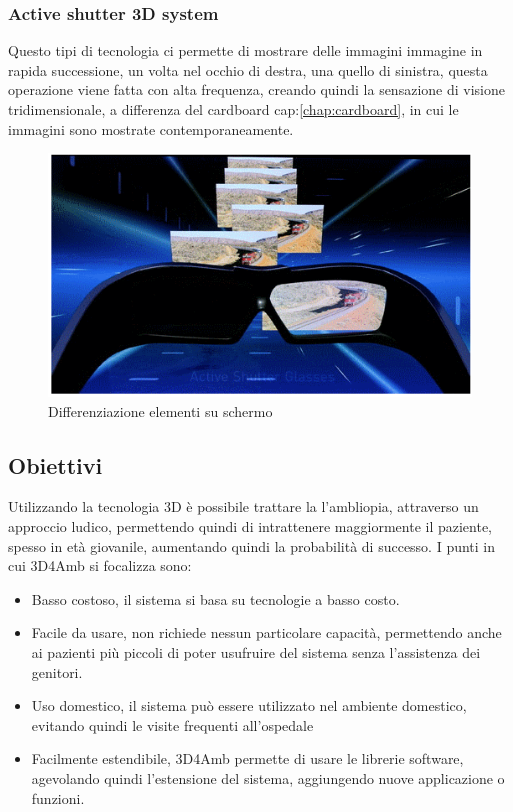 \documentclass[10pt,a4paper]{article}
\begin{document}
	\subsubsection{Active shutter 3D system}
	Questo tipi di tecnologia ci permette di mostrare delle immagini immagine in rapida successione, un volta nel occhio di destra, una quello di sinistra, questa operazione viene fatta con alta frequenza, creando quindi la sensazione di visione tridimensionale, a differenza del cardboard cap:\ref{chap:cardboard}, in cui le immagini sono mostrate contemporaneamente.
		\begin{figure}[H]
		\centering
		\includegraphics[width=0.7\linewidth]{image/active-shutter-3d-technology}
		\caption{Differenziazione elementi su schermo }
		\label{fig:occhiali active-shutter-3d-technology}
	\end{figure}

	\subsection{Obiettivi}
	Utilizzando la tecnologia 3D è possibile trattare la l'ambliopia, attraverso un approccio ludico, permettendo quindi di intrattenere maggiormente il paziente, spesso in età giovanile, aumentando quindi la probabilità di successo.
	I punti in cui 3D4Amb si focalizza sono:
	\begin{itemize}
		\item Basso costoso, il sistema si basa su tecnologie a basso costo.
		\item Facile da usare, non richiede nessun particolare capacità, permettendo anche ai pazienti più piccoli di poter usufruire del sistema senza l'assistenza dei genitori.
		\item Uso domestico, il sistema può essere utilizzato nel ambiente domestico, evitando quindi le visite frequenti all'ospedale
		\item Facilmente estendibile, 3D4Amb permette di usare le librerie software, agevolando  quindi l'estensione del sistema, aggiungendo nuove applicazione o funzioni.
	\end{itemize}
	\newpage
	\null
	\newpage
	
\end{document}
